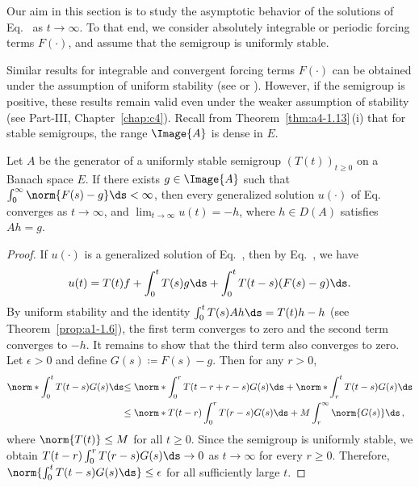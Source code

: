 Our aim in this section is to study the asymptotic behavior of the solutions of Eq.~ as $t \to \infty$. 
To that end, we consider absolutely integrable or periodic forcing terms $F(\cdot)$, and assume that the semigroup
is uniformly stable.

Similar results for integrable and convergent forcing terms $F(\cdot)$ can
be obtained under the assumption of uniform stability (see \textcite[p.119]{pazy:1983} or \textcite{neubrander:1985b}). 
However, if the
semigroup is positive, these results remain valid even under the weaker assumption of stability (see Part-III, Chapter~\ref{chap:c4}).
Recall from Theorem~\ref{thm:a4-1.13}\,(i) that for stable
semigroups, the range $\Image{A}$ is dense in $E$.

\begin{theorem}\label{thm:a4-2.1}
Let $A$ be the generator of a uniformly stable semigroup
$(T(t))_{t \geq 0}$ on a Banach space $E$. 
If there exists $g \in \Image{A}$ such that
$\int_{0}^{\infty} \norm{F(s) - g}  \ds < \infty$, then every generalized solution $u(\cdot)$ of
Eq.~ converges as $t \to \infty$, and $\lim_{t \to \infty} u(t) = -h$, where $h \in D(A)$ satisfies
$Ah = g$.
\end{theorem}

\begin{proof}
If\/ $u(\cdot)$ is a generalized solution of Eq.~, then by Eq.~, we have
\[
u(t) = T(t)f + \int_{0}^{t} T(s)g  \ds + \int_{0}^{t} T(t-s)(F(s)-g)  \ds.
\]
By uniform
stability and the identity $\int_0^t T(s)Ah \ds = T(t)h - h$ (see Theorem~\ref{prop:a1-1.6}), the first term converges to zero
and the second term converges to $-h$. 
It remains to show that the
third term also converges to zero. 
Let $\epsilon > 0$ and define $G(s) \coloneqq F(s)-g$. 
Then for any $r>0$,
\begin{align*}
\norm*{\int_{0}^{t} T(t-s)G(s)  \ds} & 
{\leq \norm*{\int_{0}^{r} T(t-r+r-s)G(s)  \ds} + \norm*{\int_{r}^{t} T(t-s)G(s)  \ds}}\\
& 
{\leq \norm*{T(t-r)\int_{0}^{r} T(r-s)G(s)  \ds} + M \int_{r}^{\infty} \norm{G(s)}  \ds\,},
\end{align*}
where $\norm{T(t)}\le M$ for all $t\ge 0$. Since the semigroup is uniformly stable, we obtain
$T(t-r)\int_{0}^{r} T(r-s)G(s)  \ds \to 0$ as $t \to \infty$ for every $r \geq 0$.
Therefore, $\norm{\int_{0}^{t} T(t-s)G(s)  \ds} \leq \epsilon$ for all sufficiently large $t$.
\end{proof}


